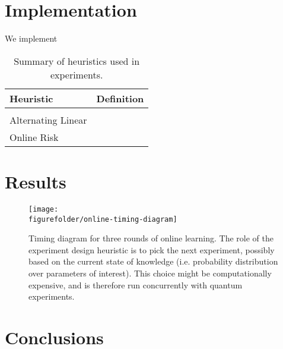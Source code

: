 \documentclass[aps,nofootinbib,prl,twocolumn,superscriptaddress]{revtex4}
\newcommand{\figurefolder}{../fig}
\begin{document}
\section{Implementation}
\label{sec:implementation}

We implement 

\begin{table}
    \centering
    \begin{tabularx}{\textwidth}{lX}
        \textbf{Heuristic} & \textbf{Definition} \\
        \hline \\
        Alternating Linear &  \\
        Online Risk
    \end{tabularx}
    \caption{Summary of heuristics used in experiments.}
    \label{tab:heuristics}
\end{table}    

\section{Results}
\label{sec:results}

\begin{figure*}
    \texttt{[image: \\figurefolder/online-timing-diagram]}
    \caption{Timing diagram for three rounds of online learning. The role of the
    experiment design heuristic is to pick the next experiment, possibly based
    on the current state of knowledge (i.e. probability distribution over parameters
    of interest). This choice might be computationally expensive, and is 
    therefore run concurrently with quantum experiments.}
    \label{fig:online-timing-diagram}
\end{figure*}

\section{Conclusions}
\label{sec:conclusions}
\end{document}
